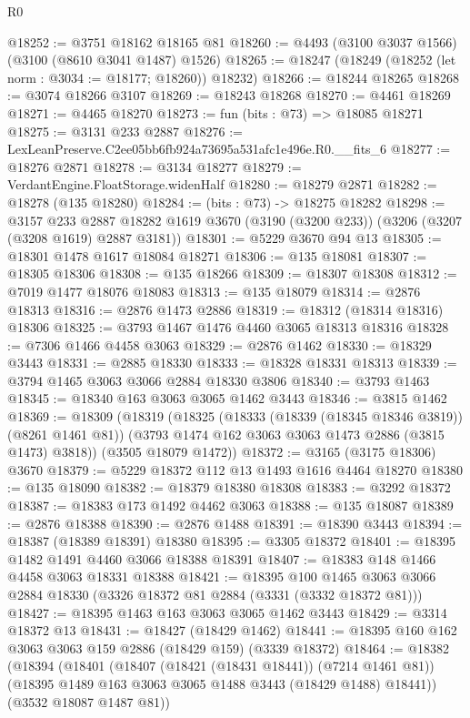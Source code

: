 \begin{lexlean}{R0}
\begin{coremodule}
@18252 := @3751 @18162 @18165 @81
@18260 := @4493 (@3100 @3037 @1566) (@3100 (@8610 @3041 @1487) @1526)
@18265 := @18247 (@18249 (@18252 (let norm : @3034 := @18177; @18260)) @18232)
@18266 := @18244 @18265
@18268 := @3074 @18266 @3107
@18269 := @18243 @18268
@18270 := @4461 @18269
@18271 := @4465 @18270
@18273 := fun (bits : @73) => @18085 @18271
@18275 := @3131 @233 @2887
@18276 := LexLeanPreserve.C2ee05bb6fb924a73695a531afc1e496e.R0.__fits_6
@18277 := @18276 @2871
@18278 := @3134 @18277
@18279 := VerdantEngine.FloatStorage.widenHalf
@18280 := @18279 @2871
@18282 := @18278 (@135 @18280)
@18284 := (bits : @73) -> @18275 @18282
@18298 := @3157
    @233
    @2887
    @18282
    @1619
    @3670
    (@3190 (@3200 @233))
    (@3206 (@3207 (@3208 @1619) @2887 @3181))
@18301 := @5229 @3670 @94 @13
@18305 := @18301 @1478 @1617 @18084 @18271
@18306 := @135 @18081
@18307 := @18305 @18306
@18308 := @135 @18266
@18309 := @18307 @18308
@18312 := @7019 @1477 @18076 @18083
@18313 := @135 @18079
@18314 := @2876 @18313
@18316 := @2876 @1473 @2886
@18319 := @18312 (@18314 @18316) @18306
@18325 := @3793 @1467 @1476 @4460 @3065 @18313 @18316
@18328 := @7306 @1466 @4458 @3063
@18329 := @2876 @1462
@18330 := @18329 @3443
@18331 := @2885 @18330
@18333 := @18328 @18331 @18313
@18339 := @3794 @1465 @3063 @3066 @2884 @18330 @3806
@18340 := @3793 @1463
@18345 := @18340 @163 @3063 @3065 @1462 @3443
@18346 := @3815 @1462
@18369 := @18309
    (@18319
      (@18325
        (@18333 (@18339 (@18345 @18346 @3819)) (@8261 @1461 @81))
        (@3793 @1474 @162 @3063 @3063 @1473 @2886 (@3815 @1473) @3818))
      (@3505 @18079 @1472))
@18372 := @3165 (@3175 @18306) @3670
@18379 := @5229 @18372 @112 @13 @1493 @1616 @4464 @18270
@18380 := @135 @18090
@18382 := @18379 @18380 @18308
@18383 := @3292 @18372
@18387 := @18383 @173 @1492 @4462 @3063
@18388 := @135 @18087
@18389 := @2876 @18388
@18390 := @2876 @1488
@18391 := @18390 @3443
@18394 := @18387 (@18389 @18391) @18380
@18395 := @3305 @18372
@18401 := @18395 @1482 @1491 @4460 @3066 @18388 @18391
@18407 := @18383 @148 @1466 @4458 @3063 @18331 @18388
@18421 := @18395
    @100
    @1465
    @3063
    @3066
    @2884
    @18330
    (@3326 @18372 @81 @2884 (@3331 (@3332 @18372 @81)))
@18427 := @18395 @1463 @163 @3063 @3065 @1462 @3443
@18429 := @3314 @18372 @13
@18431 := @18427 (@18429 @1462)
@18441 := @18395 @160 @162 @3063 @3063 @159 @2886 (@18429 @159) (@3339 @18372)
@18464 := @18382
    (@18394
      (@18401
        (@18407 (@18421 (@18431 @18441)) (@7214 @1461 @81))
        (@18395 @1489 @163 @3063 @3065 @1488 @3443 (@18429 @1488) @18441))
      (@3532 @18087 @1487 @81))

\end{coremodule}
\end{lexlean}
